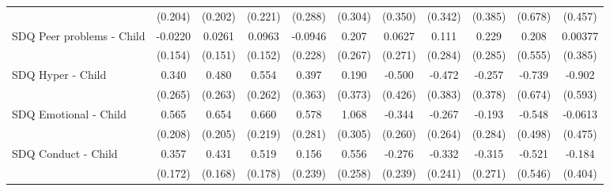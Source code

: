 {\begin{tabular}{l*{10}{c}}
            &     (0.204)         &     (0.202)         &     (0.221)         &     (0.288)         &     (0.304)         &     (0.350)         &     (0.342)         &     (0.385)         &     (0.678)         &     (0.457)         \\
\addlinespace
SDQ Peer problems - Child&     -0.0220         &      0.0261         &      0.0963         &     -0.0946         &       0.207         &      0.0627         &       0.111         &       0.229         &       0.208         &     0.00377         \\
            &     (0.154)         &     (0.151)         &     (0.152)         &     (0.228)         &     (0.267)         &     (0.271)         &     (0.284)         &     (0.285)         &     (0.555)         &     (0.385)         \\
\addlinespace
SDQ Hyper - Child&       0.340         &       0.480         &       0.554\sym{*}  &       0.397         &       0.190         &      -0.500         &      -0.472         &      -0.257         &      -0.739         &      -0.902         \\
            &     (0.265)         &     (0.263)         &     (0.262)         &     (0.363)         &     (0.373)         &     (0.426)         &     (0.383)         &     (0.378)         &     (0.674)         &     (0.593)         \\
\addlinespace
SDQ Emotional - Child&       0.565\sym{**} &       0.654\sym{**} &       0.660\sym{**} &       0.578\sym{*}  &       1.068\sym{***}&      -0.344         &      -0.267         &      -0.193         &      -0.548         &     -0.0613         \\
            &     (0.208)         &     (0.205)         &     (0.219)         &     (0.281)         &     (0.305)         &     (0.260)         &     (0.264)         &     (0.284)         &     (0.498)         &     (0.475)         \\
\addlinespace
SDQ Conduct - Child&       0.357\sym{*}  &       0.431\sym{*}  &       0.519\sym{**} &       0.156         &       0.556\sym{*}  &      -0.276         &      -0.332         &      -0.315         &      -0.521         &      -0.184         \\
            &     (0.172)         &     (0.168)         &     (0.178)         &     (0.239)         &     (0.258)         &     (0.239)         &     (0.241)         &     (0.271)         &     (0.546)         &     (0.404)         \\
\bottomrule
\end{tabular}
}
